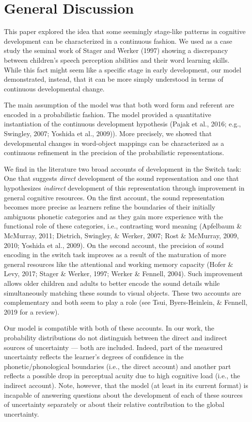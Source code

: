 \documentclass[english,,man,floatsintext]{apa6}
\theoremstyle{definition}
\theoremstyle{definition}
\theoremstyle{definition}
\theoremstyle{remark}
\begin{document}
\section{General Discussion}\label{general-discussion}

This paper explored the idea that some seemingly stage-like patterns in
cognitive development can be characterized in a continuous fashion. We
used as a case study the seminal work of Stager and Werker (1997)
showing a discrepancy between children's speech perception abilities and
their word learning skills. While this fact might seem like a specific
stage in early development, our model demonstrated, instead, that it can
be more simply understood in terms of continuous developmental change.

The main assumption of the model was that both word form and referent
are encoded in a probabilistic fashion. The model provided a
quantitative instantiation of the continuous development hypothesis
(Pajak et al., 2016; e.g., Swingley, 2007; Yoshida et al., 2009)). More
precisely, we showed that developmental changes in word-object mappings
can be characterized as a continuous refinement in the precision of the
probabilistic representations.

We find in the literature two broad accounts of development in the
Switch task: One that suggests \emph{direct} development of the sound
representation and one that hypothesizes \emph{indirect} development of
this representation through improvement in general cognitive resources.
On the first account, the sound representation becomes more precise as
learners refine the boundaries of their initially ambiguous phonetic
categories and as they gain more experience with the functional role of
these categories, i.e., contrasting word meaning (Apfelbaum \& McMurray,
2011; Dietrich, Swingley, \& Werker, 2007; Rost \& McMurray, 2009, 2010;
Yoshida et al., 2009). On the second account, the precision of sound
encoding in the switch task improves as a result of the maturation of
more general resources like the attentional and working memory capacity
(Hofer \& Levy, 2017; Stager \& Werker, 1997; Werker \& Fennell, 2004).
Such improvement allows older children and adults to better encode the
sound details while simultaneously matching these sounds to visual
objects. These two accounts are complementary and both seem to play a
role (see Tsui, Byers-Heinlein, \& Fennell, 2019 for a review).

Our model is compatible with both of these accounts. In our work, the
probability distributions do not distinguish between the direct and
indirect sources of uncertainty --- both are included. Indeed, part of
the measured uncertainty reflects the learner's degrees of confidence in
the phonetic/phonological boundaries (i.e., the direct account) and
another part reflects a possible drop in perceptual acuity due to high
cognitive load (i.e., the indirect account). Note, however, that the
model (at least in its current format) is incapable of answering
questions about the development of each of these sources of uncertainty
separately or about their relative contribution to the global
uncertainty.
\end{document}
